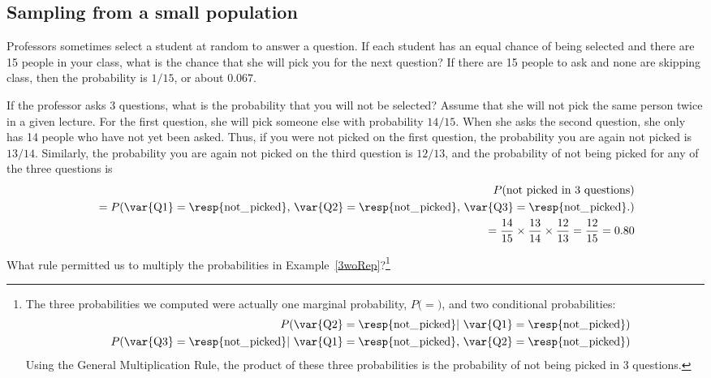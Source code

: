 \subsection{Sampling from a small population}
\label{smallPop}

\begin{example}{Professors sometimes select a student at random to answer a question. If each student has an equal chance of being selected and there are 15 people in your class, what is the chance that she will pick you for the next question?}
If there are 15 people to ask and none are skipping class, then the probability is $1/15$, or about $0.067$.
\end{example}

\begin{example}{If the professor asks 3 questions, what is the probability that you will not be selected? Assume that she will not pick the same person twice in a given lecture.}\label{3woRep}
For the first question, she will pick someone else with probability $14/15$. When she asks the second question, she only has 14 people who have not yet been asked. Thus, if you were not picked on the first question, the probability you are again not picked is $13/14$. Similarly, the probability you are again not picked on the third question is $12/13$, and the probability of not being picked for any of the three questions is
\begin{eqnarray*}
&&P(\text{not picked in 3 questions}) \\
&&\quad = P(\text{\var{Q1}} = \text{\resp{not\_\hspace{0.3mm}picked}, }\text{\var{Q2}} = \text{\resp{not\_\hspace{0.3mm}picked}, }\text{\var{Q3}} = \text{\resp{not\_\hspace{0.3mm}picked}.}) \\
&&\quad = \frac{14}{15}\times\frac{13}{14}\times\frac{12}{13} = \frac{12}{15} = 0.80
\end{eqnarray*}
\end{example}

\begin{exercise}
What rule permitted us to multiply the probabilities in Example~\ref{3woRep}?\footnote{The three probabilities we computed were actually one marginal probability, $P($$ = $$)$, and two conditional probabilities:
\begin{eqnarray*}
&&P(\text{\var{Q2}} =  \text{\resp{not\_\hspace{0.3mm}picked}}|\text{ \var{Q1}} = \text{\resp{not\_\hspace{0.3mm}picked}}) \\
&&P(\text{\var{Q3}} =  \text{\resp{not\_\hspace{0.3mm}picked}}|\text{ \var{Q1}} = \text{\resp{not\_\hspace{0.3mm}picked}, }\text{\var{Q2}} = \text{\resp{not\_\hspace{0.3mm}picked}})
\end{eqnarray*}
Using the General Multiplication Rule, the product of these three probabilities is the probability of not being picked in 3 questions.}
\end{exercise}

